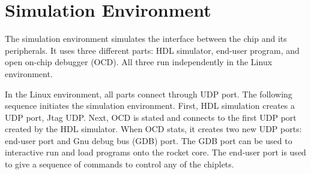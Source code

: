\documentclass[../main.tex]{subfiles}
\begin{document}
\section{Simulation Environment}
\label{sec:sim-env}
The simulation environment simulates the interface between the chip and its peripherals. It uses three different parts: HDL simulator, end-user program, and open on-chip debugger (OCD).  All three run independently in the Linux environment.

In the Linux environment, all parts connect through UDP port. The following sequence initiates the simulation environment. First, HDL simulation creates a UDP port, Jtag UDP. Next, OCD is stated and connects to the first UDP port created by the HDL simulator. When OCD stats, it creates two new UDP ports: end-user port and  Gnu debug bus (GDB) port. The GDB port can be used to interactive run and load programs onto the rocket core. The end-user port is used to give a sequence of commands to control any of the chiplets.
\end{document}

